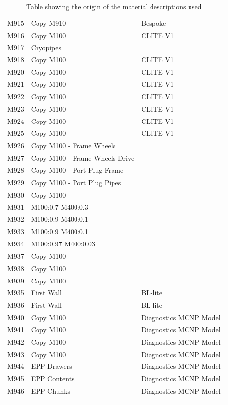 \documentclass[12pt]{article}
\begin{document}
\begin{centering}
\begin{longtable}[ht!]{ p{} | p{} | p{} }
  M915 & Copy M910 & Bespoke \\
  M916 & Copy M100 & CLITE V1\\
  M917 & Cryopipes & \cite{neutr anal materials}\\
  M918 & Copy M100 & CLITE V1 \\
  M920 & Copy M100 & CLITE V1 \\
  M921 & Copy M100 & CLITE V1 \\
  M922 & Copy M100 & CLITE V1 \\
  M923 & Copy M100 & CLITE V1 \\
  M924 & Copy M100 & CLITE V1 \\
  M925 & Copy M100 & CLITE V1 \\
  M926 & Copy M100 - Frame Wheels & \cite{neutr_anal_materials}\\
  M927 & Copy M100 - Frame Wheels Drive & \cite{neutr_anal_materials}\\
  M928 & Copy M100 - Port Plug Frame & \cite{neutr_anal_materials}\\
  M929 & Copy M100 - Port Plug Pipes & \cite{neutr_anal_materials}\\
  M930 & Copy M100 & \cite{neutr_anal_materials}\\
  M931 & M100:0.7 M400:0.3 & \cite{neutr_anal_materials}\\
  M932 & M100:0.9 M400:0.1 & \cite{neutr_anal_materials}\\
  M933 & M100:0.9 M400:0.1 & \cite{neutr_anal_materials}\\
  M934 & M100:0.97 M400:0.03 & \cite{neutr_anal_materials}\\
  M937 & Copy M100 & \cite{neutr_anal_materials}\\
  M938 & Copy M100 & \cite{neutr_anal_materials}\\
  M939 & Copy M100 & \cite{neutr_anal_materials}\\
  M935 & First Wall & BL-lite \\
  M936 & First Wall & BL-lite \\
  M940 & Copy M100 & Diagnostics MCNP Model \\
  M941 & Copy M100 & Diagnostics MCNP Model \\
  M942 & Copy M100 & Diagnostics MCNP Model \\
  M943 & Copy M100 & Diagnostics MCNP Model \\
  M944 & EPP Drawers & Diagnostics MCNP Model \\
  M945 & EPP Contents & Diagnostics MCNP Model \\
  M946 & EPP Chunks & Diagnostics MCNP Model \\
 \caption{Table showing the origin of the material descriptions used}
 \label{tab:material_origin}
 \end{longtable}
\end{centering}
\end{document}
